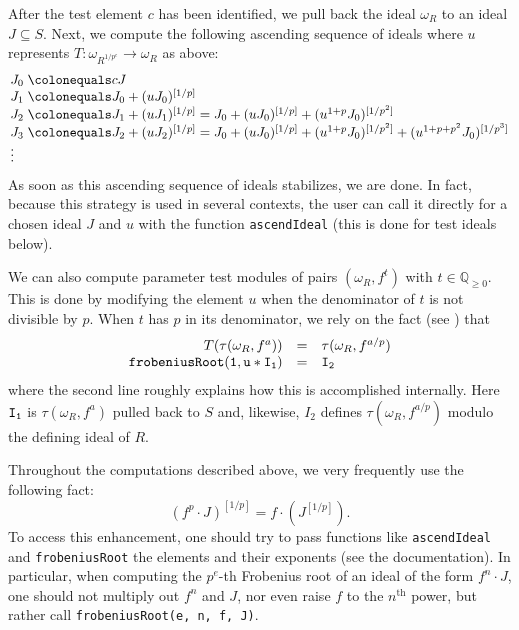 \documentclass{amsart}
\renewcommand{\geq}{\geqslant}
\begin{document}
After the test element $c$ has been identified, we pull back the ideal $\omega_R$ to an ideal $J \subseteq S$.  Next, we compute the following ascending sequence of ideals where $u$ represents $T:\omega_{R^{1/p^e}} \to \omega_R$ as above:
\begin{equation}
{\arraycolsep=1.4pt
\label{eq.AscendIdealExplanation}
\begin{array}{lll}
J_0 & \colonequals  cJ \\
J_1 &\colonequals   J_0 + (u J_0)^{[1/p]} & \\
J_2 &\colonequals   J_1 + (u J_1)^{[1/p]} & = J_0 + (u J_0)^{[1/p]} + (u^{1+p} J_0)^{[1/p^2]} \\
J_3 &\colonequals    J_2 + (uJ_2)^{[1/p]} & = J_0 + (u J_0)^{[1/p]} + (u^{1+p} J_0)^{[1/p^2]} + (u^{1+p+p^2} J_0)^{[1/p^3]} \\
\vdots
\end{array}
}
\end{equation}
As soon as this ascending sequence of ideals stabilizes, we are done.
In fact, because this strategy is used in several contexts, the user can call it directly for a chosen ideal $J$ and $u$ with the function \texttt{ascendIdeal} (this is done for test ideals below).

We can also compute parameter test modules of pairs $(\omega_R, f^{t})$ with $t \in \mathbb{Q}_{\geq 0}$.
This is done by modifying the element $u$ when the denominator of $t$ is not divisible by $p$.
When $t$ has $p$ in its denominator, we rely on the fact (see \cite{BlickleMustataSmithDiscretenessAndRationalityOfFThresholds,SchwedeTuckerTestIdealFiniteMaps}) that
\[
\begin{array}{rcl}
T(\tau(\omega_R, f^a)) & = & \tau(\omega_R, f^{a/p})\\
{\tt frobeniusRoot(1, u*I_1)} & {\tt =} & {\tt I_2}
\end{array}
\]
where the second line roughly explains how this is accomplished internally.
Here ${\tt I_1}$ is $\tau(\omega_R, f^a)$ pulled back to $S$ and, likewise, $I_2$ defines $\tau(\omega_R, f^{a/p})$ modulo the defining ideal of $R$.

\begin{remark}
Throughout the computations described above, we very frequently use the following fact:
\[
(f^p \cdot J)^{[1/p]} = f \cdot (J^{[1/p]}).
\]
To access this enhancement, one should try to pass functions like \texttt{ascendIdeal} and \texttt{frobeniusRoot} the elements and their exponents (see the documentation).
In particular, when computing the $p^e$-th Frobenius root of an ideal of the form $f^n \cdot J$, one should not multiply out $f^n$ and $J$, nor even raise $f$ to the $n^\mathrm{th}$ power, but rather call \texttt{frobeniusRoot(e, n, f, J)}.
\end{remark}
\end{document}
